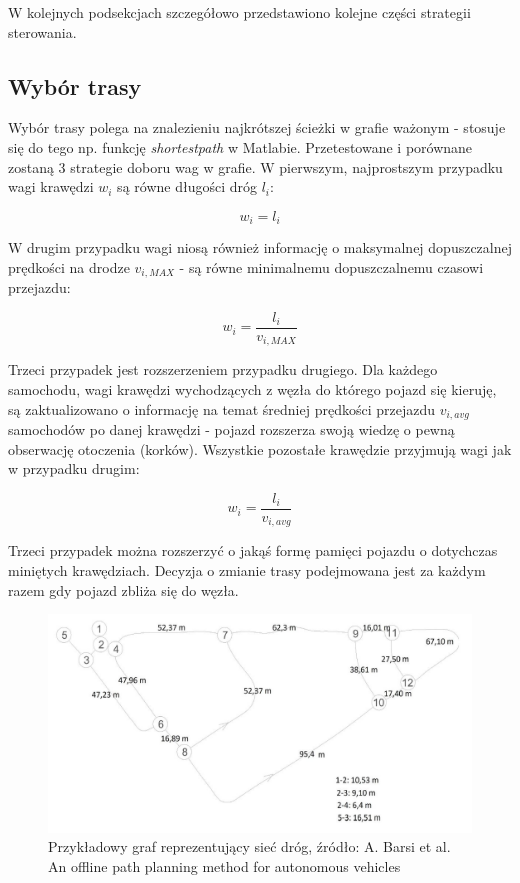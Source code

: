 W kolejnych podsekcjach szczegółowo przedstawiono kolejne części strategii sterowania.

\subsection{Wybór trasy}

Wybór trasy polega na znalezieniu najkrótszej ścieżki w grafie ważonym - stosuje się do tego np. funkcję \textit{shortestpath} w Matlabie. Przetestowane i porównane zostaną 3 strategie doboru wag w grafie. W pierwszym, najprostszym przypadku wagi krawędzi $w_i$ są równe długości dróg $l_i$:

\begin{equation}
w_i = l_i
\end{equation}

W drugim przypadku wagi niosą również informację o maksymalnej dopuszczalnej prędkości na drodze $v_{i,MAX}$ - są równe minimalnemu dopuszczalnemu czasowi przejazdu:

\begin{equation}
w_i = \frac{l_i}{v_{i,MAX}}
\end{equation}

Trzeci przypadek jest rozszerzeniem przypadku drugiego. Dla każdego samochodu, wagi krawędzi wychodzących z węzła do którego pojazd się kieruję, są zaktualizowano o informację na temat średniej prędkości przejazdu $v_{i,avg}$ samochodów po danej krawędzi - pojazd rozszerza swoją wiedzę o pewną obserwację otoczenia (korków). Wszystkie pozostałe krawędzie przyjmują wagi jak w przypadku drugim:

\begin{equation}
w_i = \frac{l_i}{v_{i,avg}}
\end{equation}

Trzeci przypadek można rozszerzyć o jakąś formę pamięci pojazdu o dotychczas miniętych krawędziach. Decyzja o zmianie trasy podejmowana jest za każdym razem gdy pojazd zbliża się do węzła.

\begin{figure}[!h]
\centering
	\centering
	\includegraphics[width=.8\linewidth]{graf.jpg}
	\caption{Przykładowy graf reprezentujący sieć dróg, źródło: A. Barsi et al. An offline path planning method for autonomous vehicles}
	\label{fig:graf}
\end{figure}

